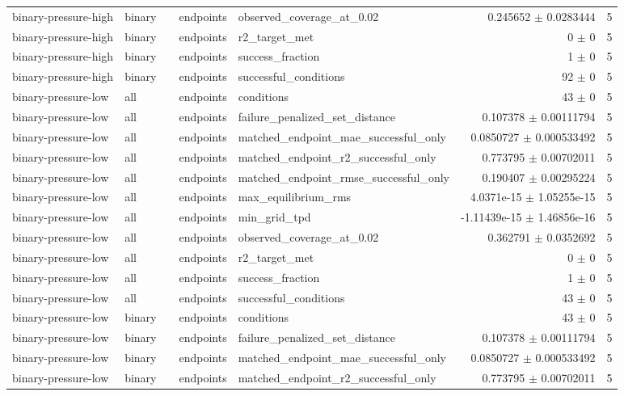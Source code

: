 \begin{tabular}{lllllrr}
binary-pressure-high & binary &  & endpoints & observed_coverage_at_0.02 & 0.245652 $\pm$ 0.0283444 & 5 \\
binary-pressure-high & binary &  & endpoints & r2_target_met & 0 $\pm$ 0 & 5 \\
binary-pressure-high & binary &  & endpoints & success_fraction & 1 $\pm$ 0 & 5 \\
binary-pressure-high & binary &  & endpoints & successful_conditions & 92 $\pm$ 0 & 5 \\
binary-pressure-low & all &  & endpoints & conditions & 43 $\pm$ 0 & 5 \\
binary-pressure-low & all &  & endpoints & failure_penalized_set_distance & 0.107378 $\pm$ 0.00111794 & 5 \\
binary-pressure-low & all &  & endpoints & matched_endpoint_mae_successful_only & 0.0850727 $\pm$ 0.000533492 & 5 \\
binary-pressure-low & all &  & endpoints & matched_endpoint_r2_successful_only & 0.773795 $\pm$ 0.00702011 & 5 \\
binary-pressure-low & all &  & endpoints & matched_endpoint_rmse_successful_only & 0.190407 $\pm$ 0.00295224 & 5 \\
binary-pressure-low & all &  & endpoints & max_equilibrium_rms & 4.0371e-15 $\pm$ 1.05255e-15 & 5 \\
binary-pressure-low & all &  & endpoints & min_grid_tpd & -1.11439e-15 $\pm$ 1.46856e-16 & 5 \\
binary-pressure-low & all &  & endpoints & observed_coverage_at_0.02 & 0.362791 $\pm$ 0.0352692 & 5 \\
binary-pressure-low & all &  & endpoints & r2_target_met & 0 $\pm$ 0 & 5 \\
binary-pressure-low & all &  & endpoints & success_fraction & 1 $\pm$ 0 & 5 \\
binary-pressure-low & all &  & endpoints & successful_conditions & 43 $\pm$ 0 & 5 \\
binary-pressure-low & binary &  & endpoints & conditions & 43 $\pm$ 0 & 5 \\
binary-pressure-low & binary &  & endpoints & failure_penalized_set_distance & 0.107378 $\pm$ 0.00111794 & 5 \\
binary-pressure-low & binary &  & endpoints & matched_endpoint_mae_successful_only & 0.0850727 $\pm$ 0.000533492 & 5 \\
binary-pressure-low & binary &  & endpoints & matched_endpoint_r2_successful_only & 0.773795 $\pm$ 0.00702011 & 5 \\

\end{tabular}
